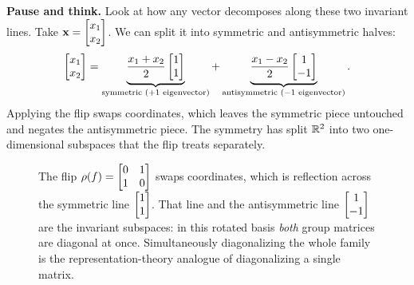 \begin{recoverybox}
\textbf{Pause and think.} Look at how any vector decomposes along these two invariant lines. Take $\mathbf{x}=\begin{bmatrix}x_1\\x_2\end{bmatrix}$. We can split it into symmetric and antisymmetric halves:
\[
  \begin{bmatrix}x_1\\x_2\end{bmatrix} = \underbrace{\frac{x_1+x_2}{2}\begin{bmatrix}1\\1\end{bmatrix}}_{\text{symmetric ($+1$ eigenvector)}} + \underbrace{\frac{x_1-x_2}{2}\begin{bmatrix}1\\-1\end{bmatrix}}_{\text{antisymmetric ($-1$ eigenvector)}}.
\]
Applying the flip swaps coordinates, which leaves the symmetric piece untouched and negates the antisymmetric piece. The symmetry has split $\mathbb{R}^2$ into two one-dimensional subspaces that the flip treats separately.
\end{recoverybox}

\begin{figure}[H]
\centering
{}
\caption{The flip $\rho(f)=\protect\begin{bmatrix}0&1\\1&0\protect\end{bmatrix}$ swaps
coordinates, which is reflection across the symmetric line $\protect\begin{bmatrix}1\\1\end{bmatrix}$.
That line and the antisymmetric line $\protect\begin{bmatrix}1\\-1\end{bmatrix}$ are the invariant
subspaces: in this rotated basis \emph{both} group matrices are diagonal at once.
Simultaneously diagonalizing the whole family is the representation-theory analogue
of diagonalizing a single matrix.}
\label{ch37:fig-rep}
\end{figure}

